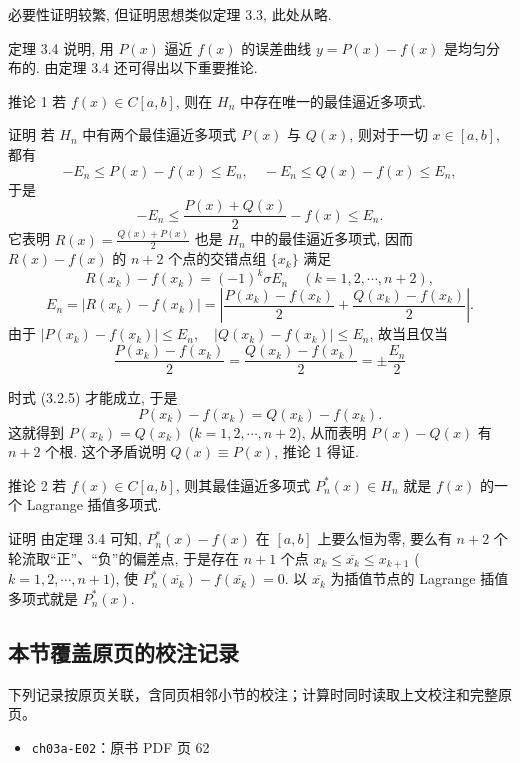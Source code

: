 \documentclass[
  10pt,
  fontset=fandol]{ctexart}
\providecommand{\tightlist}{%
  \setlength{\itemsep}{0pt}\setlength{\parskip}{0pt}}
\begin{document}
必要性证明较繁, 但证明思想类似定理 3.3, 此处从略.

定理 3.4 说明, 用 \(P(x)\) 逼近 \(f(x)\) 的误差曲线 \(y=P(x)-f(x)\) 是均匀分布的. 由定理 3.4 还可得出以下重要推论.

推论 1 若 \(f(x) \in C[a,b]\), 则在 \(H_n\) 中存在唯一的最佳逼近多项式.

证明 若 \(H_n\) 中有两个最佳逼近多项式 \(P(x)\) 与 \(Q(x)\), 则对于一切 \(x \in [a,b]\), 都有 \[
-E_n \leqslant P(x)-f(x) \leqslant E_n, \quad -E_n \leqslant Q(x)-f(x) \leqslant E_n,
\] 于是 \[
-E_n \leqslant \frac{P(x)+Q(x)}{2}-f(x) \leqslant E_n.
\] 它表明 \(R(x)=\frac{Q(x)+P(x)}{2}\) 也是 \(H_n\) 中的最佳逼近多项式, 因而 \(R(x)-f(x)\) 的 \(n+2\) 个点的交错点组 \(\{x_k\}\) 满足 \[
R(x_k)-f(x_k)=(-1)^k \sigma E_n \quad (k=1,2,\cdots,n+2),
\] \[
E_n=\left|R(x_k)-f(x_k)\right|=\left|\frac{P(x_k)-f(x_k)}{2}+\frac{Q(x_k)-f(x_k)}{2}\right|. \tag{3.2.5}
\] 由于 \(\left|P(x_k)-f(x_k)\right| \leqslant E_n, \quad \left|Q(x_k)-f(x_k)\right| \leqslant E_n\), 故当且仅当 \[
\frac{P(x_k)-f(x_k)}{2}=\frac{Q(x_k)-f(x_k)}{2}=\pm \frac{E_n}{2}
\]

时式 (3.2.5) 才能成立, 于是 \[
P(x_k)-f(x_k)=Q(x_k)-f(x_k).
\] 这就得到 \(P(x_k)=Q(x_k)\) (\(k=1,2,\cdots,n+2\)), 从而表明 \(P(x)-Q(x)\) 有 \(n+2\) 个根. 这个矛盾说明 \(Q(x) \equiv P(x)\), 推论 1 得证.

推论 2 若 \(f(x) \in C[a,b]\), 则其最佳逼近多项式 \(P_n^*(x) \in H_n\) 就是 \(f(x)\) 的一个 Lagrange 插值多项式.

证明 由定理 3.4 可知, \(P_n^*(x)-f(x)\) 在 \([a,b]\) 上要么恒为零, 要么有 \(n+2\) 个轮流取``正''、``负''的偏差点, 于是存在 \(n+1\) 个点 \(x_k \leqslant \overline{x_k} \leqslant x_{k+1}\) (\(k=1,2,\cdots,n+1\)), 使 \(P_n^*(\overline{x_k})-f(\overline{x_k})=0\). 以 \(\overline{x_k}\) 为插值节点的 Lagrange 插值多项式就是 \(P_n^*(x)\).

\subsection{本节覆盖原页的校注记录}\label{ux672cux8282ux8986ux76d6ux539fux9875ux7684ux6821ux6ce8ux8bb0ux5f55}

下列记录按原页关联，含同页相邻小节的校注；计算时同时读取上文校注和完整原页。

\begin{itemize}
\tightlist
\item
  \texttt{ch03a-E02}：原书 PDF 页 62
\end{itemize}
\end{document}

